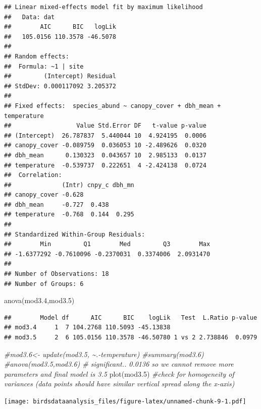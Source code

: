 \documentclass[
]{article}
\newenvironment{Shaded}{\begin{snugshade}}{\end{snugshade}}
\newcommand{\CommentTok}[1]{\textcolor[rgb]{0.56,0.35,0.01}{\textit{#1}}}
\newcommand{\FloatTok}[1]{\textcolor[rgb]{0.00,0.00,0.81}{#1}}
\newcommand{\FunctionTok}[1]{\textcolor[rgb]{0.00,0.00,0.00}{#1}}
\newcommand{\NormalTok}[1]{#1}
\begin{document}
\begin{verbatim}
## Linear mixed-effects model fit by maximum likelihood
##   Data: dat 
##        AIC      BIC   logLik
##   105.0156 110.3578 -46.5078
## 
## Random effects:
##  Formula: ~1 | site
##         (Intercept) Residual
## StdDev: 0.000117092 3.205372
## 
## Fixed effects:  species_abund ~ canopy_cover + dbh_mean + temperature 
##                  Value Std.Error DF   t-value p-value
## (Intercept)  26.787837  5.440044 10  4.924195  0.0006
## canopy_cover -0.089759  0.036053 10 -2.489626  0.0320
## dbh_mean      0.130323  0.043657 10  2.985133  0.0137
## temperature  -0.539737  0.222651  4 -2.424138  0.0724
##  Correlation: 
##              (Intr) cnpy_c dbh_mn
## canopy_cover -0.628              
## dbh_mean     -0.727  0.438       
## temperature  -0.768  0.144  0.295
## 
## Standardized Within-Group Residuals:
##        Min         Q1        Med         Q3        Max 
## -1.6377292 -0.7610096 -0.2370031  0.3374006  2.0931470 
## 
## Number of Observations: 18
## Number of Groups: 6
\end{verbatim}

\begin{Shaded}
\begin{Highlighting}[]
\FunctionTok{anova}\NormalTok{(mod3}\FloatTok{.4}\NormalTok{,mod3}\FloatTok{.5}\NormalTok{)}
\end{Highlighting}
\end{Shaded}

\begin{verbatim}
##        Model df      AIC      BIC    logLik   Test  L.Ratio p-value
## mod3.4     1  7 104.2768 110.5093 -45.13838                        
## mod3.5     2  6 105.0156 110.3578 -46.50780 1 vs 2 2.738846  0.0979
\end{verbatim}

\begin{Shaded}
\begin{Highlighting}[]
\CommentTok{\#mod3.6\textless{}{-} update(mod3.5, \textasciitilde{}.{-}temperature)}
\CommentTok{\#summary(mod3.6)}
\CommentTok{\#anova(mod3.5,mod3.6) \# significant.. 0.0136 so we cannot remove more parameters and final model is 3.5}
\FunctionTok{plot}\NormalTok{(mod3}\FloatTok{.5}\NormalTok{) }\CommentTok{\#check for homogeneity of variances (data points should have similar vertical spread along the x{-}axis)}
\end{Highlighting}
\end{Shaded}

\texttt{[image: birdsdataanalysis\_files/figure-latex/unnamed-chunk-9-1.pdf]}
\end{document}

